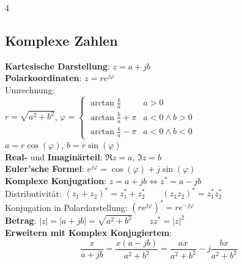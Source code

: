\documentclass[fs, footer]{latex4ei}
\begin{document}
\begin{multicols*}{4}
{        \subsection{Komplexe Zahlen}
        \textbf{Kartesische Darstellung}: $z = a + j b$\\
        \textbf{Polarkoordinaten}: $z = r  e^{j \varphi}$\\

        Umrechnung:\\
        $r = \sqrt{a^2 + b^2}$, $\varphi = \begin{cases}
                \arctan\frac{b}{a}     & a>0            \\
                \arctan\frac{b}{a}+\pi & a<0 \wedge b>0 \\
                \arctan\frac{b}{a}-\pi & a<0 \wedge b<0
            \end{cases}$\\
        $a = r  \cos(\varphi)$, $b = r  \sin(\varphi)$\\

        \textbf{Real-} und \textbf{Imaginärteil}: $\Re z = a$, $\Im z = b$\\

        \textbf{Euler'sche Formel}: $e^{j \varphi} = \cos(\varphi) + j \sin(\varphi)$\\

        \textbf{Komplexe Konjugation}: $z = a + jb \iff z^* = a - j b$\\
        Distributivität: $(z_1+z_2)^*=z_1^*+z_2^*\qquad (z_1z_2)^*=z_1^*z_2^*$\\
        Konjugation in Polardarstellung: $(r e^{j\varphi})^* = r e^{-j\varphi}$\\

        \textbf{Betrag}: $|z| = |a+jb| = \sqrt{a^2+b^2}\qquad zz^* = |z|^2$\\

        \textbf{Erweitern mit Komplex Konjugiertem}:\\
        \[
            \frac{x}{a+jb} = \frac{x(a-jb)}{a^2+b^2} = \frac{ax}{a^2+b^2} - j\frac{bx}{a^2+b^2}
        \]
    }


\end{multicols*}
\end{document}
